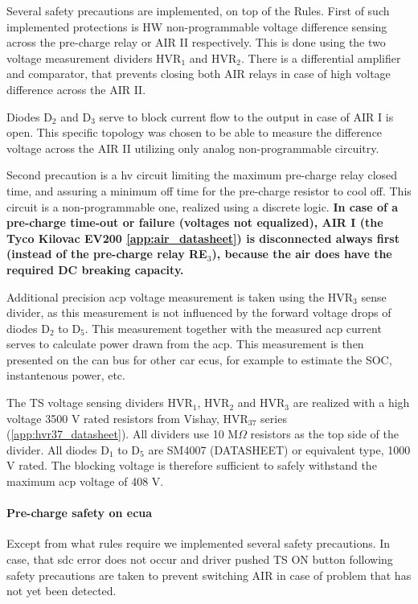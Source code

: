 Several safety precautions are implemented, on top of the Rules. First of such implemented protections is HW non-programmable voltage difference sensing across the pre-charge relay or AIR II respectively. This is done using the two voltage measurement dividers HVR$_1$ and HVR$_2$. There is a differential amplifier and comparator, that prevents closing both AIR relays in case of high voltage difference across the AIR II. 

Diodes D$_2$ and D$_3$ serve to block current flow to the output in case of AIR I is open. This specific topology was chosen to be able to measure the difference voltage across the AIR II utilizing only analog non-programmable circuitry.

Second precaution is a \gls{hv} circuit limiting the maximum pre-charge relay closed time, and assuring a minimum off time for the pre-charge resistor to cool off. This circuit is a non-programmable one, realized using a discrete logic. \label{precharge_arc_breaking}\textbf{In case of a pre-charge time-out or failure (voltages not equalized), AIR I (the Tyco Kilovac EV200 \ref{app:air_datasheet}) is disconnected always first (instead of the pre-charge relay RE$_3$), because the \gls{air} does have the required DC breaking capacity.}

Additional precision \gls{acp} voltage measurement is taken using the HVR$_3$ sense divider, as this measurement is not influenced by the forward voltage drops of diodes D$_2$ to D$_5$. This measurement together with the measured \gls{acp} current serves to calculate power drawn from the \gls{acp}. This measurement is then presented on the \gls{can} bus for other car \glspl{ecu}, for example to estimate the SOC, instantenous power, etc.  

The TS voltage sensing dividers HVR$_1$, HVR$_2$ and HVR$_3$ are realized with a high voltage 3500 V rated resistors from Vishay, HVR$_{37}$ series (\ref{app:hvr37_datasheet}). All dividers use 10 M$\Omega$ resistors as the top side of the divider. All diodes D$_1$ to D$_5$ are SM4007 (DATASHEET) or equivalent type, 1000 V rated. The blocking voltage is therefore sufficient to safely withstand the maximum \gls{acp} voltage of 408 V.

\paragraph{Pre-charge safety on \gls{ecua}}
Except from what rules require we implemented several safety precautions. In case, that \gls{sdc} error does not occur and driver pushed TS ON button following safety precautions are taken to prevent switching AIR in case of problem that has not yet been detected.

